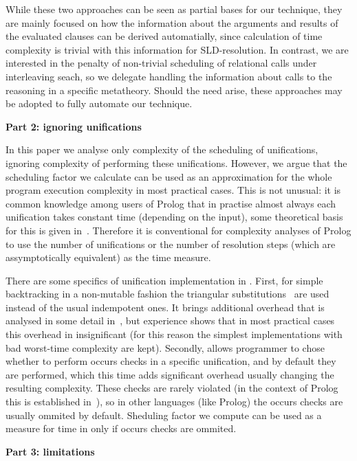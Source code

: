 While these two approaches can be seen as partial bases for our technique, they are mainly focused on how the information about the arguments and results of the evaluated clauses can be derived automatially, since calculation of time complexity is trivial with this information for SLD-resolution. In contrast, we are interested in the penalty of non-trivial scheduling of relational calls under interleaving seach, so we delegate handling the information about calls to the reasoning in a specific metatheory. Should the need arise, these approaches may be adopted to fully automate our technique.

\colorbox{yellow!20}{\textbf{Part 2: ignoring unifications}}

In this paper we analyse only complexity of the scheduling of unifications, ignoring complexity of performing these unifications. However, we argue that the scheduling factor we calculate can be used as an approximation for the whole program execution complexity in most practical cases. This is not unusual: it is common knowledge among users of Prolog that in practise almost always each unification takes constant time (depending on the input), some theoretical basis for this is given in~\cite{UnificationAverageCost}. Therefore it is conventional for complexity analyses of Prolog to use the number of unifications or the number of resolution steps (which are assymptotically equivalent) as the time measure.

There are some specifics of unification implementation in \mK. First, for simple backtracking in a non-mutable fashion the triangular substitutions~\cite{UnificationTheory} are used instead of the usual indempotent ones. It brings additional overhead that is analysed in some detail in~\cite{WillsTheisis}, but experience shows that in most practical cases this overhead in insignificant (for this reason the simplest implementations with bad worst-time complexity are kept). Secondly, \mK allows programmer to chose whether to perform occurs checks in a specific unification, and by default they are performed, which this time adds significant overhead usually changing the resulting complexity. These checks are rarely violated (in the context of Prolog this is established in~\cite{OccursChecksRevisited}), so in other languages (like Prolog) the occurs checks are usually ommited by default. Sheduling factor we compute can be used as a measure for time in \mK only if occurs checks are ommited.

\colorbox{yellow!20}{\textbf{Part 3: limitations}}

